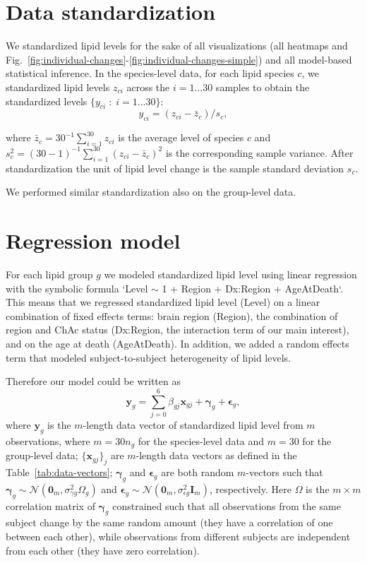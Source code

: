 \documentclass[letterpaper]{article}
\begin{document}
\section{Data standardization}

We standardized lipid levels for the sake of all visualizations (all heatmaps
and Fig.~\ref{fig:individual-changes}-\ref{fig:individual-changes-simple}) and
all model-based
statistical inference.  In the species-level data, for each lipid species $c$,
we standardized lipid levels $z_{ci}$ across the $i = 1...30$ samples to
obtain the standardized levels $\{y_{ci}\;:\; i = 1...30\}$:
\begin{equation}
	y_{ci} = (z_{ci} - \bar{z}_c) / s_c,
\end{equation}

where $\bar{z}_c = 30^{-1} \sum_{i=1}^{30} z_{ci}$ is the average level of
species $c$ and $s^2_c = (30 - 1)^{-1} \sum_{i=1}^{30} (z_{ci} - \bar{z}_c)^2$
is the corresponding sample variance.  After standardization the unit of lipid
level change is the sample standard deviation $s_c$.

We performed similar standardization also on the group-level data.

\section{Regression model}

For each lipid group $g$ we modeled standardized lipid level using linear
regression with the symbolic formula `Level $\sim$ 1 + Region + Dx:Region +
AgeAtDeath`.  This means that we regressed standardized lipid level (Level) on
a linear combination of fixed effects terms: brain region (Region), the
combination of region and ChAc status (Dx:Region, the interaction term of our
main interest), and on the age at death (AgeAtDeath).  In addition, we added a
random effects term that modeled subject-to-subject heterogeneity of lipid
levels.

Therefore our model could be written as
\begin{equation}
	\mathbf{y}_{g} = \sum_{j=0}^{6} \beta_{gj} \mathbf{x}_{gj} + \mathbf{\gamma}_{g} + \mathbf{\epsilon}_{g},
	\label{eq:main-model}
\end{equation}
where $\mathbf{y}_{g}$ is the $m$-length data vector of standardized lipid
level from $m$ observations, where $m = 30 n_g$ for the species-level data and
$m = 30$ for the group-level data; $\{\mathbf{x}_{gj}\}_j$ are $m$-length
data vectors as defined in the Table~\ref{tab:data-vectors};
$\mathbf{\gamma}_{g}$ and $\mathbf{\epsilon}_{g}$ are both random $m$-vectors
such that
$\mathbf{\gamma}_{g} \sim \mathcal{N}(\mathbf{0}_m, \sigma^2_{\gamma
g}\Omega_g)$ and
$\mathbf{\epsilon}_{g} \sim \mathcal{N}(\mathbf{0}_m, \sigma^2_{\epsilon g}
\mathbf{I}_m)$, respectively.  Here $\Omega$ is the $m \times m$ correlation
matrix of $\mathbf{\gamma}_{g}$ constrained such that all observations from
the same subject change by the same random amount (they have a correlation of
one between each other), while observations from different subjects are
independent from each other (they have zero correlation).
\end{document}
